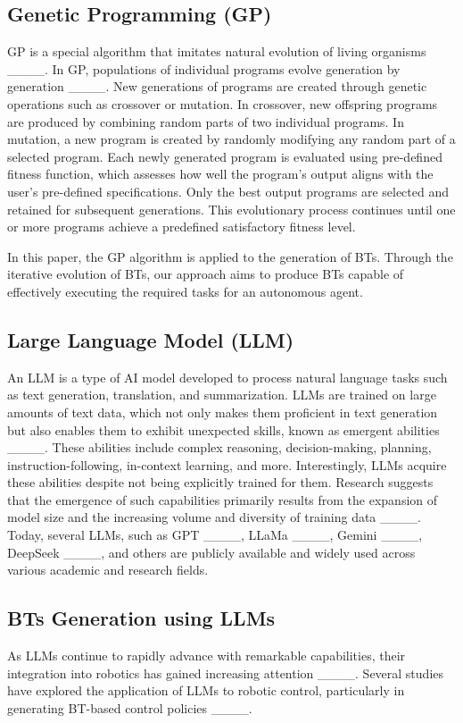 \subsection{Genetic Programming (GP)}
GP is a special algorithm that imitates natural evolution of living organisms ____. In GP, populations of individual programs evolve generation by generation ____. New generations of programs are created through genetic operations such as crossover or mutation. In crossover, new offspring programs are produced by combining random parts of two individual programs. In mutation, a new program is created by randomly modifying any random part of a selected program.  Each newly generated program is evaluated using pre-defined fitness function, which assesses how well the program’s output aligns with the user’s pre-defined specifications. Only the best output programs are selected and retained for subsequent generations. This evolutionary process continues until one or more programs achieve a predefined satisfactory fitness level.

In this paper, the GP algorithm is applied to the generation of BTs. Through the iterative evolution of BTs, our approach aims to produce BTs capable of effectively executing the required tasks for an autonomous agent.

\subsection{Large Language Model (LLM)}
An LLM is a type of AI model developed to process natural language tasks such as text generation, translation, and summarization. LLMs are trained on large amounts of text data, which not only makes them proficient in text generation but also enables them to exhibit unexpected skills, known as emergent abilities ____. These abilities include complex reasoning, decision-making, planning, instruction-following, in-context learning, and more. Interestingly, LLMs acquire these abilities despite not being explicitly trained for them. Research suggests that the emergence of such capabilities primarily results from the expansion of model size and the increasing volume and diversity of training data ____. Today, several LLMs, such as GPT ____, LLaMa ____, Gemini ____, DeepSeek ____, and others are publicly available and widely used across various academic and research fields.

\subsection{BTs Generation using LLMs}
As LLMs continue to rapidly advance with remarkable capabilities, their integration into robotics has gained increasing attention ____. Several studies have explored the application of LLMs to robotic control, particularly in generating BT-based control policies ____. 

